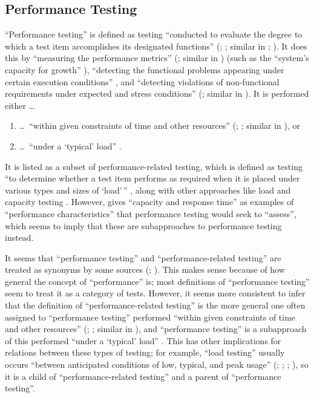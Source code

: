 \subsection{Performance Testing}
\label{perf-test-ambiguity}

``Performance testing'' is defined as testing ``conducted to evaluate the
degree to which a test item accomplishes its designated functions''
(\citealp[p.~7]{IEEE2022}; \citeyear[p.~320]{IEEE2017}; similar in
\citeyear[pp.~38-39]{IEEE2021}; \citealp[p.~1187]{Moghadam2019}). It does this
by ``measuring the performance metrics'' (\citealp[p.~1187]{Moghadam2019};
similar in \citealpISTQB{}) (such as the ``system's capacity for growth''
\citep[p.~23]{Gerrard2000b}), ``detecting the functional problems appearing
under certain execution conditions'' \citep[p.~1187]{Moghadam2019}, and
``detecting violations of non-functional requirements under expected and
stress conditions'' (\citealp[p.~1187]{Moghadam2019}; similar in
\citep[p.~5-9]{SWEBOK2024}). It is performed either \dots\
\begin{enumerate}
      \item \dots\ ``within given constraints of time and other resources''
            (\citealp[p.~7]{IEEE2022}; \citeyear[p.~320]{IEEE2017}; similar in
            \citealp[p.~1187]{Moghadam2019}), or
      \item \dots\ ``under a `typical' load'' \citep[p.~39]{IEEE2021}.
\end{enumerate}

It is listed as a subset of performance-related testing, which is defined as
testing ``to determine whether a test item performs as required when it is
placed under various types and sizes of `load'\,'' \citeyearpar[p.~38]{IEEE2021},
along with other approaches like load and capacity testing
\citep[p.~22]{IEEE2022}. However, \citet[p.~5-9]{SWEBOK2024}
gives ``capacity and response time'' as examples of ``performance
characteristics'' that performance testing would seek to ``assess'', which
seems to imply that these are subapproaches to performance testing instead.

It seems that ``performance testing'' and ``performance-related testing''
are treated as synonyms by some sources (\citealp[p.~5-9]{SWEBOK2024};
\citealp[p.~1187]{Moghadam2019}). This makes sense because of how general the
concept of ``performance'' is; most definitions of ``performance testing'' seem
to treat it as a category of tests. However, it seems more consistent to infer
that the definition of ``performance-related testing'' is the more general one
often assigned to ``performance testing'' performed ``within given constraints
of time and other resources'' (\citealp[p.~7]{IEEE2022};
\citeyear[p.~320]{IEEE2017}; similar in \citealp[p.~1187]{Moghadam2019}), and
``performance testing'' is a subapproach of this performed ``under a `typical'
load'' \citep[p.~39]{IEEE2021}. This has other implications for relations
between these types of testing; for example, ``load testing'' usually occurs
``between anticipated conditions of low, typical, and peak usage''
(\citealp[p.~5]{IEEE2022}; \citeyear[p.~39]{IEEE2021};
\citeyear[p.~253]{IEEE2017} ; \citealpISTQB{}), so it is a
child of ``performance-related testing'' and a parent of ``performance testing''.

